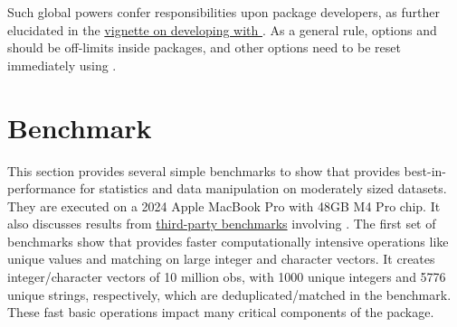 \documentclass[nojss]{jss} %
\newcommand{\fct}[1]{\code{#1()}}
\begin{document}
Such global powers confer responsibilities upon package developers, as further elucidated in the \href{https://sebkrantz.github.io/collapse/articles/developing_with_collapse.html#some-notes-on-global-options}{vignette on developing with }. As a general rule, options  and  should be off-limits inside packages, and other options need to be reset immediately using \fct{on.exit}.
%
\section{Benchmark} \label{sec:bench}
%
This section provides several simple benchmarks to show that  provides best-in- performance for statistics and data manipulation on moderately sized datasets. They are executed on a 2024 Apple MacBook Pro with 48GB M4 Pro chip. It also discusses results from \href{https://github.com/fastverse/fastverse/wiki/Benchmarks}{third-party benchmarks} involving . The first set of benchmarks show that  provides faster computationally intensive operations like unique values and matching on large integer and character vectors. It creates integer/character vectors of 10 million obs, with 1000 unique integers and 5776 unique strings, respectively, which are deduplicated/matched in the benchmark. These fast basic operations impact many critical components of the package. %
%
\end{document}
